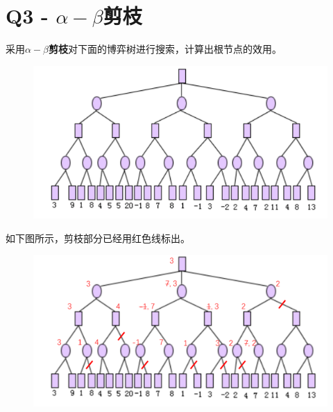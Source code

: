 \documentclass[a4paper, 11pt]{article}
\begin{document}
\section{Q3 - $\alpha-\beta$剪枝}
\begin{question}
采用\textbf{$\alpha-\beta$剪枝}对下面的博弈树进行搜索，计算出根节点的效用。
\begin{figure}[H]
\centering
\includegraphics[width=\linewidth]{fig/Q3.png}
\end{figure}
\end{question}
\begin{answer}
如下图所示，剪枝部分已经用红色线标出。
\begin{figure}[H]
\centering
\includegraphics[width=\linewidth]{fig/A3.png}
\end{figure}
\end{answer}
\begin{flushleft}
\end{flushleft}
\end{document}
